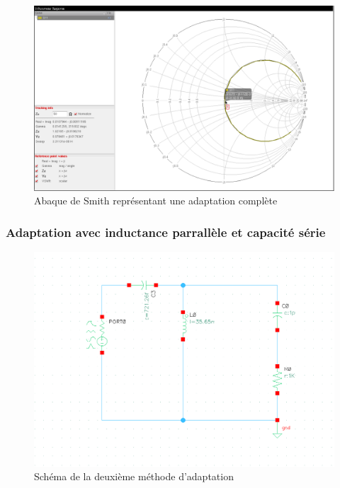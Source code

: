 \documentclass[a4paper]{article}
\begin{document}
\clearpage

\begin{figure}[!htb]
\begin{center}
  \includegraphics[width=\linewidth]{smith-induct-series-1st-adapt.png}
  \caption{Abaque de Smith repr\'esentant une adaptation compl\`ete}
\end{center}
\end{figure}

\subsubsection{Adaptation avec inductance parrall\`ele et capacit\'e s\'erie}

\begin{figure}[!htb]
\begin{center}
  \includegraphics[scale=0.47]{architecture-Lparalle-Cseries.png}
  \caption{Sch\'ema de la deuxi\`eme m\'ethode d'adaptation}
\end{center}
\end{figure}
\end{document}
